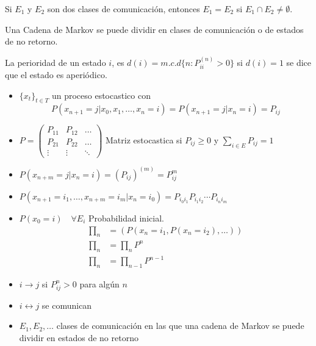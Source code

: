 \begin{teo}{}{}
    Si $E_{1}$ y $E_{2}$ son dos clases de comunicación, entonces $E_{1} = E_{2}$ si $E_{1} \cap E_{2} \neq \emptyset$.
\end{teo}

\begin{nota}[Importante]
    Una Cadena de Markov se puede dividir en clases de comunicación o de estados de no retorno.
\end{nota}

\begin{defi}{}{}
    La perioridad de un estado $i$, es $d(i) = m.c.d\{n: P_{ii}^{(n)} > 0\}$ si $d(i)= 1$ se dice que el estado es aperiódico.
\end{defi}

\begin{itemize}
    \item $\{x_{t}\}_{t \in T}$ un proceso estocastico con 
    \[P(x_{n+1}=j | x_{0}, x_{1}, \dots, x_{n} = i) = P(x_{n+1}=j | x_{n}=i) = P_{ij}\]
    \item $P=\begin{pmatrix}
        P_{11} & P_{12} & \dots \\
        P_{21} & P_{22} & \dots \\
        \vdots & \vdots & \ddots
    \end{pmatrix}$
    Matriz estocastica si $P_{ij} \geq 0$ y $\sum_{i \in E} P_{ij} = 1$
    \item $P(x_{n+m}=j|x_{n}=i) = (P_{ij})^{(m)} = P_{ij}^{m}$
    \item $P(x_{n+1}=i_{1}, \dots, x_{n+m}=i_{m}|x_{n}=i_{0})= P_{i_{0}i_{1}}P_{i_{1}i_{2}} \cdots P_{i_{n}i_{m}}$
    \item $P(x_{0}= i) \quad \forall E_{i}$ Probabilidad inicial.
    \begin{align*}
        \prod_{n} & = (P(x_{n}=i_{1}, P(x_{n}=i_{2}), \dots)) \\
        \prod_{n} & = \prod_{n}P^{n} \\
        \prod_{n} & = \prod_{n-1}P^{n-1}
    \end{align*}
    \item $i \to j$ si $P_{ij}^{n} > 0$ para algún $n$
    \item $i \leftrightarrow j$ se comunican
    \item $E_{1}, E_{2}, \dots$ clases de comunicación en las que una cadena de Markov se puede dividir en estados de no retorno
\end{itemize}

